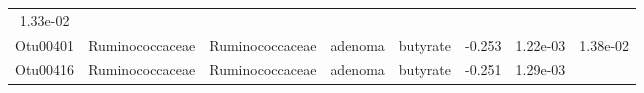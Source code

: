 \documentclass[11pt,]{article}
\begin{document}
\begin{longtable}[]{@{}cccccccc@{}}
\begin{minipage}[t]{0.08\columnwidth}
1.33e-02\strut
\end{minipage}\tabularnewline
\begin{minipage}[t]{0.08\columnwidth}\centering\strut
Otu00401\strut
\end{minipage} & \begin{minipage}[t]{0.15\columnwidth}\centering\strut
Ruminococcaceae\strut
\end{minipage} & \begin{minipage}[t]{0.15\columnwidth}\centering\strut
Ruminococcaceae\strut
\end{minipage} & \begin{minipage}[t]{0.08\columnwidth}\centering\strut
adenoma\strut
\end{minipage} & \begin{minipage}[t]{0.09\columnwidth}\centering\strut
butyrate\strut
\end{minipage} & \begin{minipage}[t]{0.07\columnwidth}\centering\strut
-0.253\strut
\end{minipage} & \begin{minipage}[t]{0.08\columnwidth}\centering\strut
1.22e-03\strut
\end{minipage} & \begin{minipage}[t]{0.08\columnwidth}\centering\strut
1.38e-02\strut
\end{minipage}\tabularnewline
\begin{minipage}[t]{0.08\columnwidth}\centering\strut
Otu00416\strut
\end{minipage} & \begin{minipage}[t]{0.15\columnwidth}\centering\strut
Ruminococcaceae\strut
\end{minipage} & \begin{minipage}[t]{0.15\columnwidth}\centering\strut
Ruminococcaceae\strut
\end{minipage} & \begin{minipage}[t]{0.08\columnwidth}\centering\strut
adenoma\strut
\end{minipage} & \begin{minipage}[t]{0.09\columnwidth}\centering\strut
butyrate\strut
\end{minipage} & \begin{minipage}[t]{0.07\columnwidth}\centering\strut
-0.251\strut
\end{minipage} & \begin{minipage}[t]{0.08\columnwidth}\centering\strut
1.29e-03\strut
\end{minipage} & \begin{minipage}[t]{0.08\columnwidth}\centering\strut

\end{minipage}
\end{longtable}
\end{document}

